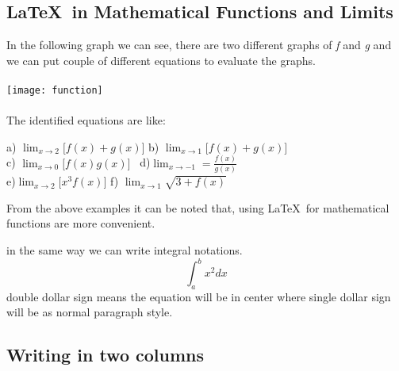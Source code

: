 \documentclass[12pt, a4paper]{article}
\begin{document}
	\subsection*{ \LaTeX\ in Mathematical Functions and Limits}
	
	In the following graph we can see, there are two different graphs of \emph{f} and \emph{g} and we can put couple of different equations to evaluate the graphs.  \\
	\\
	
	\texttt{[image: function]}\\
	\\
	The identified equations are like:
	
		
	
		\noindent a) $\displaystyle{\lim_{x \to 2}[f(x) + g(x)}]$
		b) $\displaystyle{\lim_{x \to 1}[f(x) + g(x)}]$
		\\
		c) $\displaystyle{\lim_{x \to 0}[f(x)  g(x)}]$      \space \space \space
		\
		d)$ \displaystyle\lim_{x \to -1} = \frac{f(x) }{g(x)}  $
		\\
		e)$   \displaystyle{\lim_{x \to 2}[x^3  f(x)}] $\space \space \indent \space \space
		f) $\displaystyle{\lim_{x \to 1}\sqrt {3 + f(x)}}$
		
		\break
		\noindent From the above examples it can be noted that, using \LaTeX\ for mathematical functions are more convenient.
		
		\noindent in the same way we can write integral notations.
		$$\int_{a}^{b} x^2 dx$$
		double dollar sign means the equation will be in center where single dollar sign will be as normal paragraph style.
		
	\subsection*{Writing in two columns}
	
\end{document}
